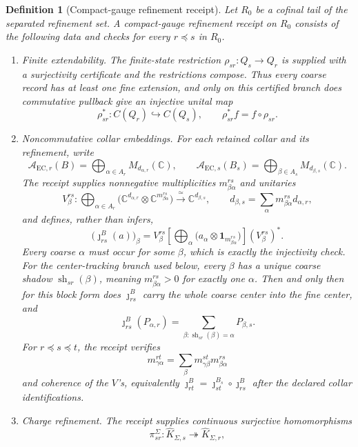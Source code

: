 \documentclass[11pt]{article}
\newtheorem{definition}[theorem]{Definition}
\begin{document}
\begin{definition}[Compact-gauge refinement receipt]\label{def:compact-gauge-refinement-receipt}
Let \(R_0\) be a cofinal tail of the separated refinement set. A compact-gauge refinement receipt
on \(R_0\) consists of the following data and checks for every \(r\preceq s\) in \(R_0\).
\begin{enumerate}
\item \emph{Finite extendability.} The finite-state restriction
\(\rho_{sr}:Q_s\to Q_r\) is supplied with a surjectivity certificate and the restrictions compose.
Thus every coarse record has at least one fine extension, and only on this certified branch does
commutative pullback give an injective unital map
\[
\rho_{sr}^*:C(Q_r)\hookrightarrow C(Q_s),\qquad
\rho_{sr}^*f=f\circ\rho_{sr}.
\]
\item \emph{Noncommutative collar embeddings.} For each retained collar and its refinement, write
\[
\mathcal A_{\mathrm{EC},r}(B)=\bigoplus_{\alpha\in A_r}M_{d_{\alpha,r}}(\mathbb C),
\qquad
\mathcal A_{\mathrm{EC},s}(B_s)=\bigoplus_{\beta\in A_s}M_{d_{\beta,s}}(\mathbb C).
\]
The receipt supplies nonnegative multiplicities \(m_{\beta\alpha}^{rs}\) and unitaries
\[
V_\beta^{rs}:\bigoplus_{\alpha\in A_r}
  \bigl(\mathbb C^{d_{\alpha,r}}\otimes\mathbb C^{m_{\beta\alpha}^{rs}}\bigr)
  \xrightarrow{\ \simeq\ }\mathbb C^{d_{\beta,s}},
\qquad
d_{\beta,s}=\sum_\alpha m_{\beta\alpha}^{rs}d_{\alpha,r},
\]
and defines, rather than infers,
\[
\bigl(\jmath_{rs}^{B}(a)\bigr)_\beta
=V_\beta^{rs}
 \left[\bigoplus_\alpha\bigl(a_\alpha\otimes
 \mathbf 1_{m_{\beta\alpha}^{rs}}\bigr)\right]
 (V_\beta^{rs})^*.
\]
Every coarse \(\alpha\) must occur for some \(\beta\), which is exactly the injectivity check.
For the center-tracking branch used below, every \(\beta\) has a unique coarse shadow
\(\operatorname{sh}_{sr}(\beta)\), meaning
\(m_{\beta\alpha}^{rs}>0\) for exactly one \(\alpha\). Then and only then for this block form does
\(\jmath_{rs}^{B}\) carry the whole coarse center into the fine center, and
\[
\jmath_{rs}^{B}(P_{\alpha,r})
=\sum_{\beta:\operatorname{sh}_{sr}(\beta)=\alpha}P_{\beta,s}.
\]
For \(r\preceq s\preceq t\), the receipt verifies
\[
m_{\gamma\alpha}^{rt}=\sum_\beta
m_{\gamma\beta}^{st}m_{\beta\alpha}^{rs}
\]
and coherence of the \(V\)'s, equivalently
\(\jmath_{rt}^{B}=\jmath_{st}^{B_s}\circ\jmath_{rs}^{B}\) after the declared collar
identifications.
\item \emph{Charge refinement.} The receipt supplies continuous surjective homomorphisms
\[
\pi_{sr}^{\Sigma}:\widehat K_{\Sigma,s}\twoheadrightarrow\widehat K_{\Sigma,r},
\]
\end{enumerate}
\end{definition}
\end{document}
